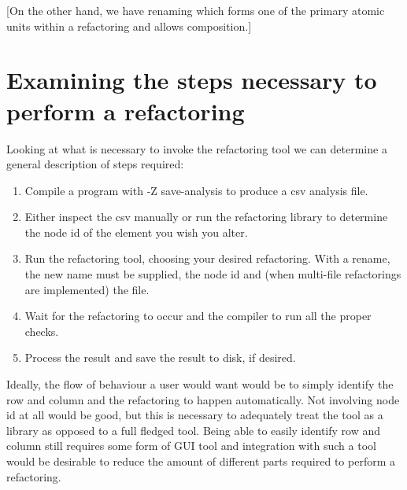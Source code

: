 [On the other hand, we have renaming which forms one of the primary atomic units within a refactoring and allows composition.]


\section{Examining the steps necessary to perform a refactoring}

Looking at what is necessary to invoke the refactoring tool we can determine a general description of steps required:

\begin{enumerate}
\item Compile a program with -Z save-analysis to produce a csv analysis file.
\item Either inspect the csv manually or run the refactoring library to determine the node id of the element you wish you alter.
\item Run the refactoring tool, choosing your desired refactoring. With a rename, the new name must be supplied, the node id and (when multi-file refactorings are implemented) the file.
\item Wait for the refactoring to occur and the compiler to run all the proper checks. 
\item Process the result and save the result to disk, if desired.
\end{enumerate}

Ideally, the flow of behaviour a user would want would be to simply identify the row and column and the refactoring to happen automatically. Not involving node id at all would be good, but this is necessary to adequately treat the tool as a library as opposed to a full fledged tool. Being able to easily identify row and column still requires some form of GUI tool and integration with such a tool would be desirable to reduce the amount of different parts required to perform a refactoring. 

